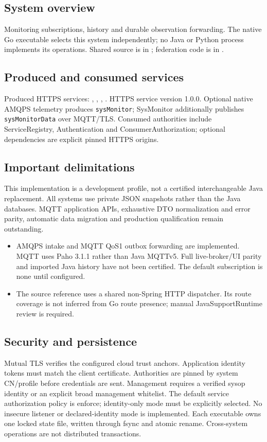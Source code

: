 \documentclass[a4paper]{arrowhead}
\begin{document}
\subsection{System overview}
Monitoring subscriptions, history and durable observation forwarding. The native Go executable selects this system independently; no Java or Python process implements its operations. Shared source is in ; federation code is in .
\subsection{Produced and consumed services}
Produced HTTPS services: , \allowbreak {}, \allowbreak {}, \allowbreak {}.
HTTPS service version 1.0.0. Optional native AMQPS telemetry produces \texttt{sysMonitor}; SysMonitor additionally publishes \texttt{sysMonitorData} over MQTT/TLS. Consumed authorities include ServiceRegistry, Authentication and ConsumerAuthorization; optional dependencies are explicit pinned HTTPS origins.
\subsection{Important delimitations}
This implementation is a development profile, not a certified interchangeable Java replacement. All systems use private JSON snapshots rather than the Java databases. MQTT application APIs, exhaustive DTO normalization and error parity, automatic data migration and production qualification remain outstanding.
\begin{itemize}
\item AMQPS intake and MQTT QoS1 outbox forwarding are implemented. MQTT uses Paho 3.1.1 rather than Java MQTTv5. Full live-broker/UI parity and imported Java history have not been certified. The default subscription is none until configured.
\item The source reference uses a shared non-Spring HTTP dispatcher. Its route coverage is not inferred from Go route presence; manual JavaSupportRuntime review is required.
\end{itemize}
\subsection{Security and persistence}
Mutual TLS verifies the configured cloud trust anchors. Application identity tokens must match the client certificate. Authorities are pinned by system CN/profile before credentials are sent. Management requires a verified sysop identity or an explicit broad management whitelist. The default service authorization policy is enforce; identity-only mode must be explicitly selected. No insecure listener or declared-identity mode is implemented. Each executable owns one locked state file, written through fsync and atomic rename. Cross-system operations are not distributed transactions.
\clearpage
\end{document}
